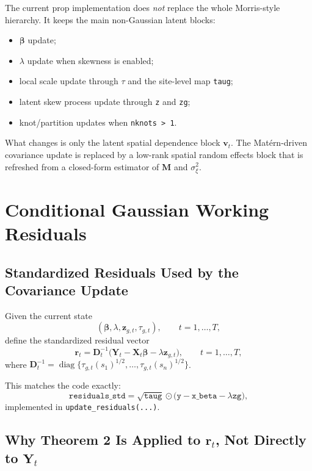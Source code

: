 \documentclass[11pt]{article}
\newcommand{\bY}{\mathbf{Y}}
\newcommand{\bX}{\mathbf{X}}
\newcommand{\bD}{\mathbf{D}}
\newcommand{\bM}{\mathbf{M}}
\newcommand{\bz}{\mathbf{z}}
\newcommand{\br}{\mathbf{r}}
\newcommand{\diag}{\operatorname{diag}}
\begin{document}
The current prop implementation does \emph{not} replace the whole Morris-style
hierarchy. It keeps the main non-Gaussian latent blocks:

\begin{itemize}
\item $\bm{\beta}$ update;
\item $\lambda$ update when skewness is enabled;
\item local scale update through $\tau$ and the site-level map \texttt{taug};
\item latent skew process update through \texttt{z} and \texttt{zg};
\item knot/partition updates when \texttt{nknots > 1}.
\end{itemize}

What changes is only the latent spatial dependence block $\mathbf{v}_t$. The
Mat\'ern-driven covariance update is replaced by a low-rank spatial random
effects block that is refreshed from a closed-form estimator of $\bM$ and
$\sigma_\xi^2$.

\section{Conditional Gaussian Working Residuals}

\subsection{Standardized Residuals Used by the Covariance Update}

Given the current state
\[
(\bm{\beta}, \lambda, \bz_{g,t}, \tau_{g,t}), \qquad t=1,\ldots,T,
\]
define the standardized residual vector
\begin{equation}
\br_t
=
\bD_t^{-1}
\bigl(
\bY_t - \bX_t \bm{\beta} - \lambda \bz_{g,t}
\bigr),
\qquad
t=1,\ldots,T,
\label{eq:std-resid}
\end{equation}
where $\bD_t^{-1} = \diag\{\tau_{g,t}(s_1)^{1/2}, \ldots,
\tau_{g,t}(s_n)^{1/2}\}$.

This matches the code exactly:
\[
\texttt{residuals\_std}
=
\sqrt{\texttt{taug}} \odot
\bigl(
\texttt{y} - \texttt{x\_beta} - \lambda \texttt{zg}
\bigr),
\]
implemented in \texttt{update\_residuals(...)}.

\subsection{Why Theorem 2 Is Applied to \texorpdfstring{$\br_t$}{r\_t}, Not Directly to \texorpdfstring{$\bY_t$}{Y\_t}}
\end{document}
